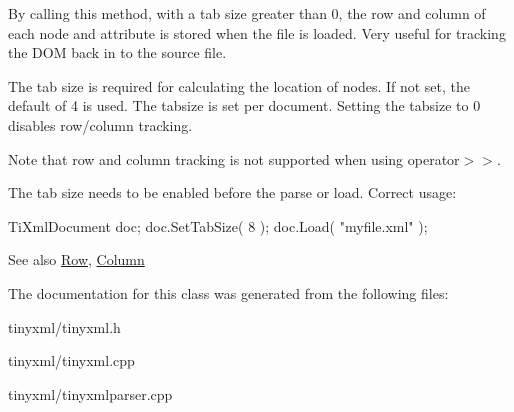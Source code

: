 \-By calling this method, with a tab size greater than 0, the row and column of each node and attribute is stored when the file is loaded. \-Very useful for tracking the \-D\-O\-M back in to the source file.

\-The tab size is required for calculating the location of nodes. \-If not set, the default of 4 is used. \-The tabsize is set per document. \-Setting the tabsize to 0 disables row/column tracking.

\-Note that row and column tracking is not supported when using operator$>$$>$.

\-The tab size needs to be enabled before the parse or load. \-Correct usage\-: \begin{DoxyVerb}
		TiXmlDocument doc;
		doc.SetTabSize( 8 );
		doc.Load( "myfile.xml" );
		\end{DoxyVerb}


\begin{DoxySeeAlso}{\-See also}
\hyperlink{class_ti_xml_base_a024bceb070188df92c2a8d8852dd0853}{\-Row}, \hyperlink{class_ti_xml_base_ab54bfb9b70fe6dd276e7b279cab7f003}{\-Column} 
\end{DoxySeeAlso}


\-The documentation for this class was generated from the following files\-:\begin{DoxyCompactItemize}
\item 
tinyxml/tinyxml.\-h\item 
tinyxml/tinyxml.\-cpp\item 
tinyxml/tinyxmlparser.\-cpp\end{DoxyCompactItemize}
